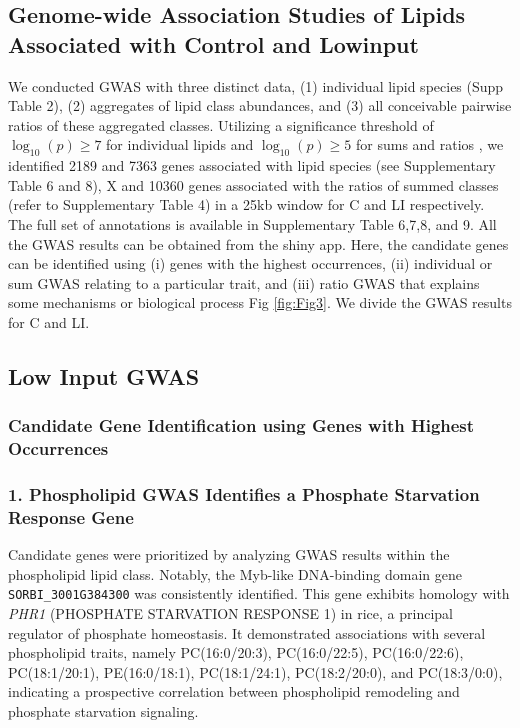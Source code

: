 \documentclass[10pt,letterpaper]{article}
\begin{document}
\subsection*{Genome-wide Association Studies of Lipids Associated with Control and Lowinput}
We conducted GWAS with three distinct data, (1) individual lipid species (Supp Table 2), (2) aggregates of lipid class abundances, and (3) all conceivable pairwise ratios of these aggregated classes. Utilizing a significance threshold of $\log_{10}(p)\ge7$ for individual lipids and $\log_{10}(p)\ge5$ for sums and ratios , we identified 2189 and 7363 genes associated with lipid species (see Supplementary Table 6 and 8), X and 10360  genes associated with the ratios of summed classes (refer to Supplementary Table 4) in a 25kb window for C and LI respectively. The full set of annotations is available in Supplementary Table 6,7,8, and 9. All the GWAS results can be obtained from the shiny app. Here, the candidate genes can be identified using (i) genes with the highest occurrences, (ii) individual or sum GWAS relating to a particular trait, and (iii) ratio GWAS that explains some mechanisms or biological process Fig \ref{fig:Fig3}. We divide the GWAS results for C and LI.



\subsection*{Low Input GWAS}
\subsubsection*{Candidate Gene Identification using Genes with Highest Occurrences}
\subsubsection*{1. Phospholipid GWAS Identifies a Phosphate Starvation Response Gene}
Candidate genes were prioritized by analyzing GWAS results within the phospholipid lipid class. Notably, the Myb-like DNA-binding domain gene \texttt{SORBI\_3001G384300} was consistently identified. This gene exhibits homology with \textit{PHR1} (PHOSPHATE STARVATION RESPONSE 1) in rice, a principal regulator of phosphate homeostasis. It demonstrated associations with several phospholipid traits, namely PC(16:0/20:3), PC(16:0/22:5), PC(16:0/22:6), PC(18:1/20:1), PE(16:0/18:1), PC(18:1/24:1), PC(18:2/20:0), and PC(18:3/0:0), indicating a prospective correlation between phospholipid remodeling and phosphate starvation signaling.
\end{document}
